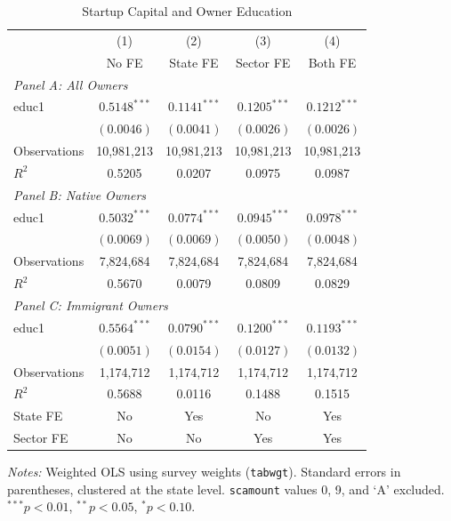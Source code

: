\begin{table}[htbp]
\centering
\caption{Startup Capital and Owner Education}
\label{tab:capital_educ}
\begin{threeparttable}
\begin{tabular}{lcccc}
\toprule
 & (1) & (2) & (3) & (4) \\
 & No FE & State FE & Sector FE & Both FE \\
\midrule
\multicolumn{5}{l}{\textit{Panel A: All Owners}} \\[3pt]
\quad educ1 & $0.5148^{***}$ & $0.1141^{***}$ & $0.1205^{***}$ & $0.1212^{***}$ \\
 & $(0.0046)$ & $(0.0041)$ & $(0.0026)$ & $(0.0026)$ \\
\midrule
\quad Observations & 10,981,213 & 10,981,213 & 10,981,213 & 10,981,213 \\
\quad $R^{2}$ & 0.5205 & 0.0207 & 0.0975 & 0.0987 \\
\midrule
\multicolumn{5}{l}{\textit{Panel B: Native Owners}} \\[3pt]
\quad educ1 & $0.5032^{***}$ & $0.0774^{***}$ & $0.0945^{***}$ & $0.0978^{***}$ \\
 & $(0.0069)$ & $(0.0069)$ & $(0.0050)$ & $(0.0048)$ \\
\midrule
\quad Observations & 7,824,684 & 7,824,684 & 7,824,684 & 7,824,684 \\
\quad $R^{2}$ & 0.5670 & 0.0079 & 0.0809 & 0.0829 \\
\midrule
\multicolumn{5}{l}{\textit{Panel C: Immigrant Owners}} \\[3pt]
\quad educ1 & $0.5564^{***}$ & $0.0790^{***}$ & $0.1200^{***}$ & $0.1193^{***}$ \\
 & $(0.0051)$ & $(0.0154)$ & $(0.0127)$ & $(0.0132)$ \\
\midrule
\quad Observations & 1,174,712 & 1,174,712 & 1,174,712 & 1,174,712 \\
\quad $R^{2}$ & 0.5688 & 0.0116 & 0.1488 & 0.1515 \\
\midrule
State FE & No & Yes & No & Yes \\
Sector FE & No & No & Yes & Yes \\
\bottomrule
\end{tabular}
\begin{tablenotes}
\footnotesize
\item \textit{Notes:} Weighted OLS using survey weights (\texttt{tabwgt}).
Standard errors in parentheses, clustered at the state level.
\texttt{scamount} values 0, 9, and `A' excluded.
$^{***}p<0.01$, $^{**}p<0.05$, $^{*}p<0.10$.
\end{tablenotes}
\end{threeparttable}
\end{table}

